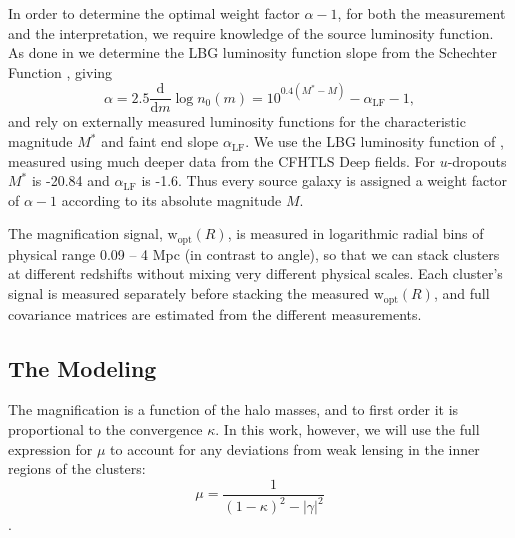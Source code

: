 In order to determine the optimal weight factor $\alpha-1$, for both the measurement and the interpretation, we require knowledge of the source luminosity function. As done in \citet{Ford12} we determine the LBG luminosity function slope from the Schechter Function \citep{Schechter76}, giving
\begin{equation}
\alpha = 2.5 \frac{\mathrm{d}}{\mathrm{d}m}\log n_0(m) = 10^{0.4(M^\ast-M)}-\alpha_{\mathrm{LF}}-1,
\end{equation}
and rely on externally measured luminosity functions for the characteristic magnitude $M^\ast$ and faint end slope $\alpha_{\mathrm{LF}}$. We use the LBG luminosity function of \citet{vanderBurg10}, measured using much deeper data from the CFHTLS Deep fields. For $u$-dropouts $M^\ast$ is -20.84 and $\alpha_{\mathrm{LF}}$ is -1.6. Thus every source galaxy is assigned a weight factor of $\alpha-1$ according to its absolute magnitude $M$.

The magnification signal, $\mathrm{w}_{\mathrm{opt}}(R)$, is measured in logarithmic radial bins of physical range 0.09 -- 4 Mpc (in contrast to angle), so that we can stack clusters at different redshifts without mixing very different physical scales. Each cluster's signal is measured separately before stacking the measured $\mathrm{w}_{\mathrm{opt}}(R)$, and full covariance matrices are estimated from the different measurements. 


\subsection{The Modeling}
\label{model}

The magnification is a function of the halo masses, and to first order it is proportional to the convergence $\kappa$. In this work, however, we will use the full expression for $\mu$ to account for any deviations from weak lensing in the inner regions of the clusters:
\begin{equation}
\mu = \frac{1}{(1-\kappa)^2 - \left|\gamma\right|^2}
\end{equation}
\citep{BS01}.

